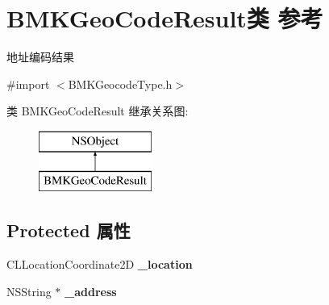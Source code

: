 \hypertarget{interface_b_m_k_geo_code_result}{\section{B\+M\+K\+Geo\+Code\+Result类 参考}
\label{interface_b_m_k_geo_code_result}
}


地址编码结果  




{\ttfamily \#import $<$B\+M\+K\+Geocode\+Type.\+h$>$}

类 B\+M\+K\+Geo\+Code\+Result 继承关系图\+:\begin{figure}[H]
\begin{center}
\leavevmode
\includegraphics[height=2.000000cm]{interface_b_m_k_geo_code_result}
\end{center}
\end{figure}
\subsection*{Protected 属性}
\begin{DoxyCompactItemize}
\item 
\hypertarget{interface_b_m_k_geo_code_result_a24d63bcf89a08aaf8d2c74bfbbcf3f41}{C\+L\+Location\+Coordinate2\+D {\bfseries \+\_\+location}}\label{interface_b_m_k_geo_code_result_a24d63bcf89a08aaf8d2c74bfbbcf3f41}

\item 
\hypertarget{interface_b_m_k_geo_code_result_a7d9c5ba3e65ea13e9787ba3c00273f1c}{N\+S\+String $\ast$ {\bfseries \+\_\+address}}\label{interface_b_m_k_geo_code_result_a7d9c5ba3e65ea13e9787ba3c00273f1c}

\end{DoxyCompactItemize}
